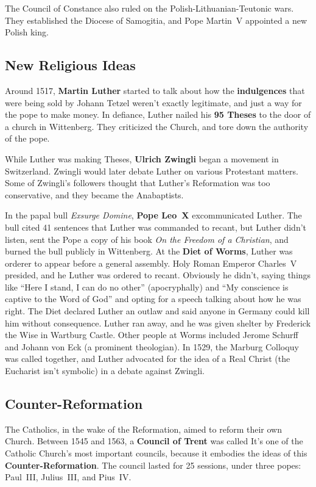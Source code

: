 The Council of Constance also ruled on the Polish-Lithuanian-Teutonic wars.
They established the Diocese of Samogitia, and Pope Martin~V appointed a new Polish king.

\subsection*{New Religious Ideas}

Around 1517, \textbf{Martin Luther} started to talk about how the \textbf{indulgences}
that were being sold by Johann Tetzel weren't exactly legitimate, and just a way for the pope to make money.
In defiance, Luther nailed his \textbf{95 Theses} to the door of a church in Wittenberg.
They criticized the Church, and tore down the authority of the pope.

While Luther was making Theses, \textbf{Ulrich Zwingli} began a movement in Switzerland.
Zwingli would later debate Luther on various Protestant matters.
Some of Zwingli's followers thought that Luther's Reformation was too conservative, and they became the Anabaptists.

In the papal bull \textit{Exsurge Domine}, \textbf{Pope Leo~X} excommunicated Luther.
The bull cited 41 sentences that Luther was commanded to recant,
but Luther didn't listen, sent the Pope a copy of his book \textit{On the Freedom of a Christian},
and burned the bull publicly in Wittenberg.
At the \textbf{Diet of Worms}, Luther was orderer to appear before a general assembly.
Holy Roman Emperor Charles~V presided, and he Luther was ordered to recant.
Obviously he didn't, saying things like
``Here I stand, I can do no other'' (apocryphally) and
``My conscience is captive to the Word of God''
and opting for a speech talking about how he was right.
The Diet declared Luther an outlaw and said anyone in Germany could kill him without consequence.
Luther ran away, and he was given shelter by Frederick the Wise in Wartburg Castle.
Other people at Worms included Jerome Schurff and Johann von Eck (a prominent theologian).
In 1529, the Marburg Colloquy was called together,
and Luther advocated for the idea of a Real Christ (the Eucharist isn't symbolic) in a debate against Zwingli.

\subsection*{Counter-Reformation}

The Catholics, in the wake of the Reformation, aimed to reform their own Church.
Between 1545 and 1563, a \textbf{Council of Trent} was called
It's one of the Catholic Church's most important councils,
because it embodies the ideas of this \textbf{Counter-Reformation}.
The council lasted for 25 sessions, under three popes: Paul~III, Julius~III, and Pius~IV\@.

